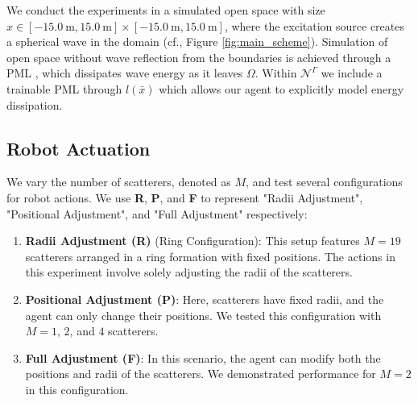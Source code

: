 We conduct the experiments in a simulated open space with size $x \in \left[\SI{-15.0}{\meter}, \SI{15.0}{\meter} \right] \times \left[\SI{-15.0}{\meter}, \SI{15.0}{\meter} \right]$, where 
the excitation source creates a spherical wave in the domain (cf., Figure \ref{fig:main_scheme}). Simulation of open space without wave reflection from the boundaries is achieved through a 
PML \cite{berenger_1994_a}, which dissipates wave energy as it leaves $\Omega$. Within $\mathcal{N}^\Gamma$ we include a trainable PML through $l(\bar{x})$ which allows our agent to explicitly model energy dissipation.%

\subsection{Robot Actuation}
We vary the number of scatterers, denoted as $M$, and test several configurations for robot actions. We use \textbf{R}, \textbf{P}, and \textbf{F} to represent "Radii Adjustment", "Positional Adjustment", and "Full Adjustment" respectively:
\begin{enumerate}
    \item \textbf{Radii Adjustment (R)} (Ring Configuration): This setup features $M = 19$ scatterers arranged in a ring formation with fixed positions. The actions in this experiment involve solely adjusting the radii of the scatterers.
    \item \textbf{Positional Adjustment (P)}: Here, scatterers have fixed radii, and the agent can only change their positions. We tested this configuration with $M = 1$, $2$, and $4$ scatterers.
    \item \textbf{Full Adjustment (F)}: In this scenario, the agent can modify both the positions and radii of the scatterers. We demonstrated performance for $M = 2$ in this configuration.
\end{enumerate}






